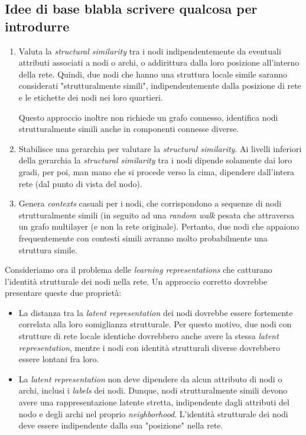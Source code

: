 \documentclass[11pt]{article}
\begin{document}
\subsection{Idee di base blabla scrivere qualcosa per introdurre}
\begin{enumerate}
\setlength{\itemsep}{1pt}
  \setlength{\parskip}{0pt}
  \setlength{\parsep}{0pt}
  \item Valuta la \textit{structural similarity} tra i nodi indipendentemente da eventuali attributi associati a nodi o archi, o addirittura dalla loro posizione all'interno della rete. Quindi, due nodi che hanno una struttura locale simile saranno considerati "strutturalmente simili", indipendentemente dalla posizione di rete e le etichette dei nodi nei loro quartieri.
  
Questo approccio inoltre non richiede un grafo connesso, identifica nodi strutturalmente simili anche in componenti connesse diverse.
  \item Stabilisce una gerarchia per valutare la \textit{structural similarity}.
Ai livelli inferiori della gerarchia la \textit{structural similarity} tra i nodi dipende solamente dai loro gradi, per poi, man mano che si procede verso la cima, dipendere dall'intera rete (dal punto di vista del nodo).
  \item Genera \textit{contexts} casuali per i nodi, che corrispondono a sequenze di nodi strutturalmente simili  (in seguito ad una \textit{random walk} pesata che attraversa un grafo multilayer (e non la rete originale). Pertanto, due nodi che appaiono frequentemente con contesti simili avranno molto probabilmente una struttura simile.
\end{enumerate}

Consideriamo ora il problema delle \textit{learning representations} che catturano l'identità strutturale dei nodi nella rete. Un approccio corretto dovrebbe presentare queste due proprietà:
\begin{itemize}
\setlength{\itemsep}{1pt}
  \setlength{\parskip}{0pt}
  \setlength{\parsep}{0pt}
  \item La distanza tra la \textit{latent representation} dei nodi dovrebbe essere fortemente correlata alla loro somiglianza strutturale. Per questo motivo, due nodi con strutture di rete locale identiche dovrebbero anche avere la stessa \textit{latent representation}, mentre i nodi con identità strutturali diverse dovrebbero essere lontani fra loro.
  \item La \textit{latent representation} non deve dipendere da alcun attributo di nodi o archi, inclusi i \textit{labels} dei nodi. Dunque, nodi strutturalmente simili devono avere una rappresentazione latente stretta, indipendente dagli attributi del nodo e degli archi nel proprio \textit{neighborhood}.
L'identità strutturale dei nodi deve essere indipendente dalla sua "posizione" nella rete.
\end{itemize}
\end{document}
